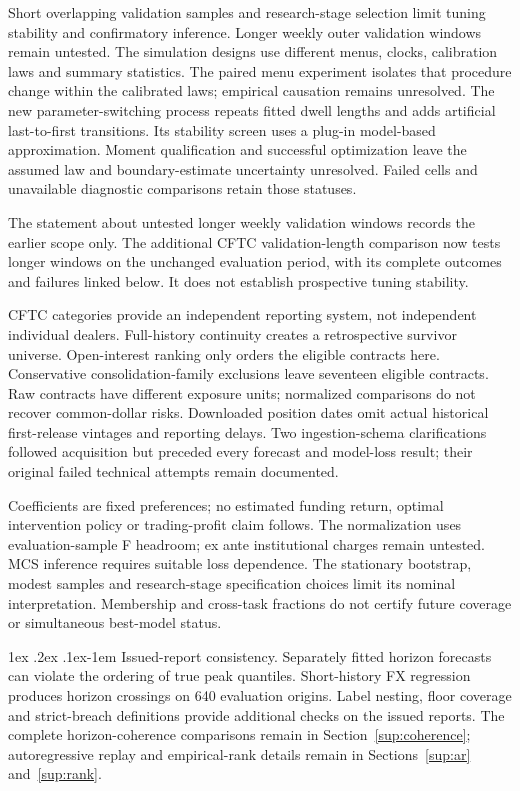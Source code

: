 \documentclass[10pt,a4paper]{article}
\makeatletter
\renewcommand\paragraph{\@startsection{paragraph}{4}{\z@}%
  {1ex \@plus .2ex \@minus .1ex}{-1em}%
  {\normalfont\normalsize\bfseries}}
\makeatother
\begin{document}
Short overlapping validation samples and research-stage selection limit tuning stability and confirmatory inference. Longer weekly outer validation windows remain untested. The simulation designs use different menus, clocks, calibration laws and summary statistics. The paired menu experiment isolates that procedure change within the calibrated laws; empirical causation remains unresolved. The new parameter-switching process repeats fitted dwell lengths and adds artificial last-to-first transitions. Its stability screen uses a plug-in model-based approximation. Moment qualification and successful optimization leave the assumed law and boundary-estimate uncertainty unresolved. Failed cells and unavailable diagnostic comparisons retain those statuses.

The statement about untested longer weekly validation windows records the earlier scope only. The additional CFTC validation-length comparison now tests longer windows on the unchanged evaluation period, with its complete outcomes and failures linked below. It does not establish prospective tuning stability.

CFTC categories provide an independent reporting system, not independent individual dealers. Full-history continuity creates a retrospective survivor universe. Open-interest ranking only orders the eligible contracts here. Conservative consolidation-family exclusions leave seventeen eligible contracts. Raw contracts have different exposure units; normalized comparisons do not recover common-dollar risks. Downloaded position dates omit actual historical first-release vintages and reporting delays. Two ingestion-schema clarifications followed acquisition but preceded every forecast and model-loss result; their original failed technical attempts remain documented.

Coefficients are fixed preferences; no estimated funding return, optimal intervention policy or trading-profit claim follows. The normalization uses evaluation-sample F headroom; ex ante institutional charges remain untested. MCS inference requires suitable loss dependence. The stationary bootstrap, modest samples and research-stage specification choices limit its nominal interpretation. Membership and cross-task fractions do not certify future coverage or simultaneous best-model status.

\paragraph{Issued-report consistency.}
Separately fitted horizon forecasts can violate the ordering of true peak quantiles. Short-history FX regression produces horizon crossings on 640 evaluation origins. Label nesting, floor coverage and strict-breach definitions provide additional checks on the issued reports.
The complete horizon-coherence comparisons remain in Section~\ref{sup:coherence}; autoregressive replay and empirical-rank details remain in Sections~\ref{sup:ar} and~\ref{sup:rank}.
\end{document}
